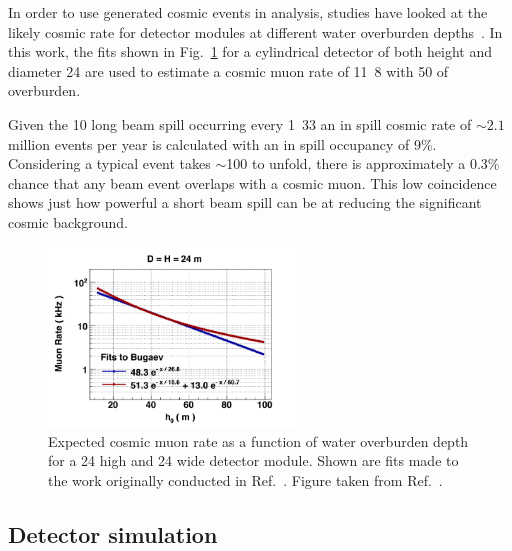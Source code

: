 In order to use generated cosmic events in analysis, studies have looked at the likely cosmic rate
for \chips detector modules at different water overburden depths~\cite{son2013}. In this work, the
fits shown in Fig.~\ref{fig:cosmic_rate} for a cylindrical detector of both height and diameter
\unit{24}{} are used to estimate a \chipsfive cosmic muon rate of
\unit{11.8}{} with \unit{50}{} of overburden.

Given the \unit{10}{\mu{}} long \numi beam spill occurring every \unit{1.33}{}
an in spill cosmic rate of $\sim2.1$ million events per year is calculated with an in spill
occupancy of 9\%. Considering a typical event takes $\sim$\unit{100}{} to unfold, there
is approximately a 0.3\% chance that any beam event overlaps with a cosmic muon. This low
coincidence shows just how powerful a short beam spill can be at reducing the significant cosmic
background.

\begin{figure} %
    \includegraphics[width=0.6\textwidth]{diagrams/4-chips/cosmic_rate.png}
    \caption[Expected \chipsfive cosmic muon rate as a function of water overburden depth]
    {Expected cosmic muon rate as a function of water overburden depth for a \unit{24}{}
        high and \unit{24}{} wide \chips detector module. Shown are fits made to the
        work originally conducted in Ref.~\cite{bugaev1998}. Figure taken from
        Ref.~\cite{son2013}.}
    \label{fig:cosmic_rate}
\end{figure}

\subsection{Detector simulation} %
\label{sec:chips_monte_carlo_sim} %

